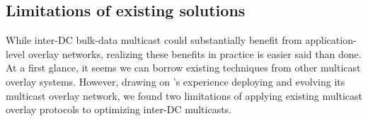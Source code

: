 
%
%
%
%

\subsection{Limitations of existing solutions}
\label{subsec:motivation:baseline}

While inter-DC bulk-data multicast could 
substantially benefit from application-level overlay networks,
realizing these benefits in practice
is easier said than done.
At a first glance, it seems we can borrow existing techniques
from other multicast overlay systems.
However, drawing on \company's experience deploying and evolving
its multicast overlay network, we found two limitations of
applying existing multicast overlay protocols to optimizing 
inter-DC multicasts.

